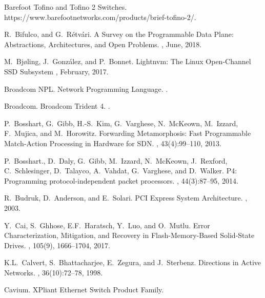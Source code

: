 \documentclass[11pt,dvipdfmx]{article}
\begin{document}
\begin{thebibliography}{10}
\itemsep=1pt
\begin{small}

  \newblock Barefoot Tofino and Tofino 2 Switches.
  \newblock https://www.barefootnetworks.com/products/brief-tofino-2/.

 R.~Bifulco, and G.~R\'etv\'ari.
  \newblock A Survey on the Programmable Data Plane: Abstractions, Architectures, and Open Problems.
  , June, 2018.

 M.~Bj{\o}ling, J.~Gonz\'alez, and P.~Bonnet.
  \newblock Lightnvm: The Linux Open-Channel SSD Subsystem
  , February, 2017.

 Broadcom NPL.
  \newblock Network Programming Language.
  .

 Broadcom.
  \newblock Broadcom Trident 4.
  .

 P.~Bosshart, G.~Gibb, H.-S.~Kim, G.~Varghese, N.~McKeown, M.~Izzard, F.~Mujica, and M.~Horowitz.
  \newblock Forwarding Metamorphosis: Fast Programmable Match-Action Processing in Hardware for SDN.
  , 43(4):99--110, 2013.

 P.~Bosshart., D.~Daly, G.~Gibb, M.~Izzard, N.~McKeown, J.~Rexford, C.~Schlesinger, D.~Talayco, A.~Vahdat, G.~Varghese, and D.~Walker.
  \newblock P4: Programming protocol-independent packet processors.
  , 44(3):87--95, 2014.

 R.~Budruk, D.~Anderson, and E.~Solari.
  \newblock PCI Express System Architecture.
  , 2003.

 Y.~Cai, S.~Ghhose, E.F.~Haratsch, Y.~Luo, and O.~Mutlu.
  \newblock Error Characterization, Mitigation, and Recovery in Flash-Memory-Based Solid-State Drives.
  , 105(9), 1666--1704, 2017.

 K.L.~Calvert, S.~Bhattacharjee, E.~Zegura, and J.~Sterbenz.
  \newblock Directions in Active Networks.
  , 36(10):72--78, 1998.

 Cavium.
  \newblock XPliant Ethernet Switch Product Family.


\end{small}
\end{thebibliography}
\end{document}
